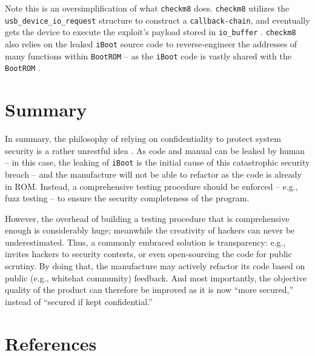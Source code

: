 \documentclass[10pt]{article}
\newcommand{\inlinecode}{\texttt}
\begin{document}
Note this is an oversimplification of what \inlinecode{checkm8} does. \inlinecode{checkm8} utilizes the \inlinecode{usb\_device\_io\_request} structure to construct a \inlinecode{callback-chain}, and eventually gets the device to execute the exploit's payload stored in \inlinecode{io\_buffer} \cite{cite:4}. \inlinecode{checkm8} also relies on the leaked \inlinecode{iBoot} source code to reverse-engineer the addresses of many functions within \inlinecode{BootROM} -- as the \inlinecode{iBoot} code is vastly shared with the \inlinecode{BootROM} \cite{cite:4}\cite{cite:1}.


\section{Summary}
In summary, the philosophy of relying on confidentiality to protect system security is a rather unrestful idea \cite{cite:1}. As code and manual can be leaked by human -- in this case, the leaking of \inlinecode{iBoot} is the initial cause of this catastrophic security breach -- and the manufacture will not be able to refactor as the code is already in ROM. Instead, a comprehensive testing procedure should be enforced -- e.g., fuzz testing -- to ensure the security completeness of the program.

However, the overhead of building a testing procedure that is comprehensive enough is considerably huge; meanwhile the creativity of hackers can never be underestimated. Thus, a commonly embraced solution is transparency: e.g., invites hackers to security contests, or even open-sourcing the code for public scrutiny. By doing that, the manufacture may actively refactor its code based on public (e.g., whitehat community) feedback. And most importantly, the objective quality of the product can therefore be improved as it is now ``more secured,'' instead of ``secured if kept confidential.''


\newpage
\section{References}

\nocite{*}
\raggedright


\end{document}
